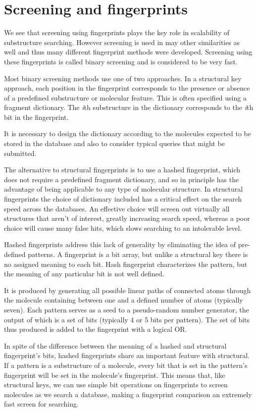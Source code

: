 \documentclass[thesis=M,english]{FITthesis}[2012/10/20]
\begin{document}
\section{Screening and fingerprints}
We see that screening using fingerprints plays the key role in scalability of substructure searching. However screening is used in may other similarities as well and thus many different fingerprint methods were developed. Screening using these fingerprints is called binary screening and is considered to be very fast.

Most binary screening methods use one of two approaches. In a structural key approach, each position in the fingerprint corresponds to the presence or absence of a predefined substructure or molecular feature. This is often specified using a fragment dictionary. The \textit{i}th substructure in the dictionary corresponds to the \textit{i}th bit in the fingerprint. 

It is necessary to design the dictionary according to the molecules expected to be stored in the database and also to consider typical queries that might be submitted.

The alternative to structural fingerprints is to use a hashed fingerprint, which does not require a predefined fragment dictionary, and so in principle has the advantage of being applicable to any type of molecular structure. In structural fingerprints the choice of dictionary included has a critical effect on the search speed across the databases. An effective choice will screen out virtually all structures that aren't of interest, greatly increasing search speed, whereas a poor choice will cause many false hits, which slows searching to an intolerable level. 

Hashed fingerprints address this lack of generality by eliminating the idea of pre-defined patterns. A fingerprint is a bit array, but unlike a structural key there is no assigned meaning to each bit. Hash fingerprint characterizes the pattern, but the meaning of any particular bit is not well defined. 

It is produced by generating all possible linear paths of connected atoms through the molecule containing between one and a defined number of atoms (typically seven). Each pattern serves as a seed to a pseudo-random number generator, the output of which is a set of bits (typically 4 or 5 bits per pattern). The set of bits thus produced is added to the fingerprint with a logical OR.\cite{daylight}

In spite of the difference between the meaning of a hashed and structural fingerprint's bits, hashed fingerprints share an important feature with structural. If a pattern is a substructure of a molecule, every bit that is set in the pattern's fingerprint will be set in the molecule's fingerprint. This means that, like structural keys, we can use simple bit operations on fingerprints to screen molecules as we search a database, making a fingerprint comparison an extremely fast screen for searching.\cite{daylight}
\end{document}
